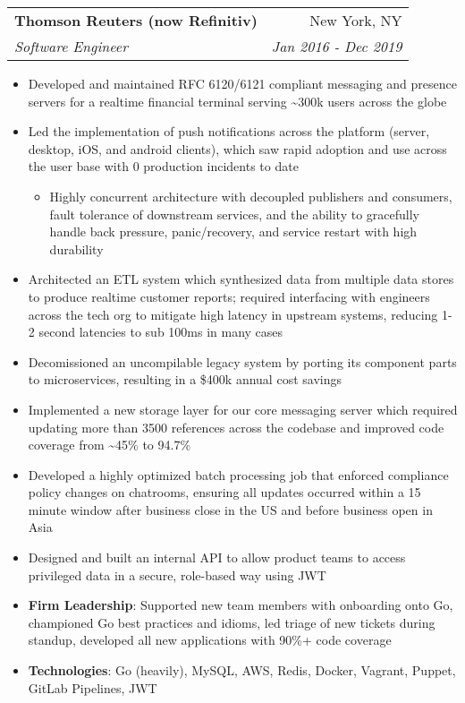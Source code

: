 \documentclass[letterpaper,11pt]{article}
\makeatletter
\newcommand{\resumeItem}[2]{
  \item\small{
    \textbf{#1}{: #2 \vspace{-2pt}}
  }
}
\newcommand{\resumeItemSimple}[1]{
  \item\small{
    {#1 \vspace{-2pt}}
  }
}
\newcommand{\resumeItemSimpleIndented}[1]{
  \item[--]\small{
    {#1 \vspace{-2pt}}
  }
}
\newcommand{\resumeSubheading}[4]{
  \vspace{-1pt}\item
    \begin{tabular*}{0.97\textwidth}[t]{l@{\extracolsep{\fill}}r}
      \textbf{#1} & #2 \\
      \textit{\small#3} & \textit{\small #4} \\
    \end{tabular*}\vspace{-5pt}
}
\newcommand{\resumeItemListStart}{\begin{itemize}}
\newcommand{\resumeItemListEnd}{\end{itemize}\vspace{-5pt}}
\makeatother
\begin{document}
    \resumeSubheading
      {Thomson Reuters (now Refinitiv)}{New York, NY}
      {Software Engineer}{Jan 2016 - Dec 2019}
      \resumeItemListStart
        \resumeItemSimple
          {Developed and maintained RFC 6120/6121 compliant messaging and presence servers for a realtime financial terminal serving \raisebox{-0.7ex}\textasciitilde 300k users across the globe}
        \resumeItemSimple
          {Led the implementation of push notifications across the platform (server, desktop, iOS, and android clients), which saw rapid adoption and use across the user base with 0 production incidents to date}
        \begin{itemize}[leftmargin=.2in]\resumeItemSimpleIndented
          {Highly concurrent architecture with decoupled publishers and consumers, fault tolerance of downstream services, and the ability to gracefully handle back pressure, panic/recovery, and service restart with high durability}
        \end{itemize}
        \resumeItemSimple
          {Architected an ETL system which synthesized data from multiple data stores to produce realtime customer reports; required interfacing with engineers across the tech org to mitigate high latency in upstream systems, reducing 1-2 second latencies to sub 100ms in many cases}
        \resumeItemSimple
          {Decomissioned an uncompilable legacy system by porting its component parts to microservices, resulting in a \$400k annual cost savings}
        \resumeItemSimple
          {Implemented a new storage layer for our core messaging server which required updating more than 3500 references across the codebase and improved code coverage from \raisebox{-0.7ex}\textasciitilde 45\% to 94.7\%}
        \resumeItemSimple
          {Developed a highly optimized batch processing job that enforced compliance policy changes on chatrooms, ensuring all updates occurred within a 15 minute window after business close in the US and before business open in Asia}
        \resumeItemSimple
          {Designed and built an internal API to allow product teams to access privileged data in a secure, role-based way using JWT}
        \resumeItem{Firm Leadership}
        {Supported new team members with onboarding onto Go, championed Go best practices and idioms, led triage of new tickets during standup, developed all new applications with 90\%+ code coverage}
        \resumeItem{Technologies}
        {Go (heavily), MySQL, AWS, Redis, Docker, Vagrant, Puppet, GitLab Pipelines, JWT}
      \resumeItemListEnd
\end{document}
